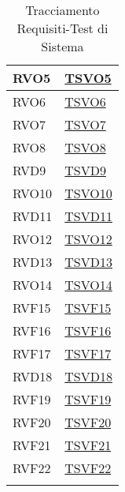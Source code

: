 \begin{longtable}[ht]{|>{\centering}m{5cm}|m{5cm}<{\centering}|}
RVO5 & \hyperlink{TVVO5}{TSVO5}\\ \hline
RVO6 & \hyperlink{TVVO6}{TSVO6}\\ \hline
RVO7 & \hyperlink{TVVO7}{TSVO7}\\ \hline
RVO8 & \hyperlink{TVVO8}{TSVO8}\\ \hline
RVD9 & \hyperlink{TVVD9}{TSVD9}\\ \hline
RVO10 & \hyperlink{TVVO10}{TSVO10}\\ \hline
RVD11 & \hyperlink{TVVD11}{TSVD11}\\ \hline
RVO12 & \hyperlink{TVVO12}{TSVO12}\\ \hline
RVD13 & \hyperlink{TVVD13}{TSVD13}\\ \hline
RVO14 & \hyperlink{TVVO14}{TSVO14}\\ \hline
RVF15 & \hyperlink{TVVF15}{TSVF15}\\ \hline
RVF16 & \hyperlink{TVVF16}{TSVF16}\\ \hline
RVF17 & \hyperlink{TVVF17}{TSVF17}\\ \hline
RVD18 & \hyperlink{TVVD18}{TSVD18}\\ \hline
RVF19 & \hyperlink{TVVF19}{TSVF19}\\ \hline
RVF20 & \hyperlink{TVVF20}{TSVF20}\\ \hline
RVF21 & \hyperlink{TVVF21}{TSVF21}\\ \hline
RVF22 & \hyperlink{TVVF22}{TSVF22}\\ \hline
\caption[Tracciamento Requisiti-Test di Sistema]{Tracciamento Requisiti-Test di Sistema}
\label{tabella:requi-tv}
\end{longtable}
\clearpage

